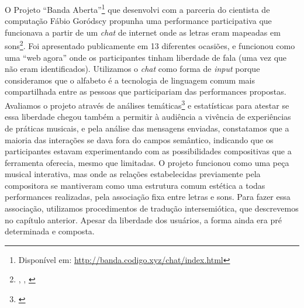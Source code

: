 O Projeto ``Banda Aberta''\footnote{Disponível em: \url{http://banda.codigo.xyz/chat/index.html}} que desenvolvi com a parceria do cientista de computação Fábio Goródscy propunha uma performance participativa que funcionava a partir de um \emph{chat} de internet onde as letras eram mapeadas em sons\footnote{\cite{Stolfi2017}, \cite{Stolfi2017w}, \cite{Stolfi2018}}. Foi apresentado publicamente em 13 diferentes ocasiões, e funcionou como uma ``web agora'' onde os participantes tinham liberdade de fala (uma vez que não eram identificados). Utilizamos o \emph{chat} como forma de \emph{input} porque consideramos que o alfabeto é a tecnologia de linguagem comum mais compartilhada entre as pessoas que participariam das performances propostas. Avaliamos o projeto através de análises temáticas\footnote{\cite{Braun2006}} e estatísticas para atestar se essa liberdade chegou também a permitir à audiência a vivência de experiências de práticas musicais, e pela análise das mensagens enviadas, constatamos que a maioria das interações se dava fora do campos semântico, indicando que os participantes estavam experimentando com as possibilidades compositivas que a ferramenta oferecia, mesmo que limitadas. O projeto funcionou como uma peça musical interativa, mas onde as relações estabelecidas previamente pela compositora se mantiveram como uma estrutura comum estética a todas performances realizadas, pela associação fixa entre letras e sons. Para fazer essa associação, utilizamos procedimentos de tradução intersemiótica, que descrevemos no capítulo anterior. Apesar da liberdade dos usuários, a forma ainda era pré determinada e composta. 




